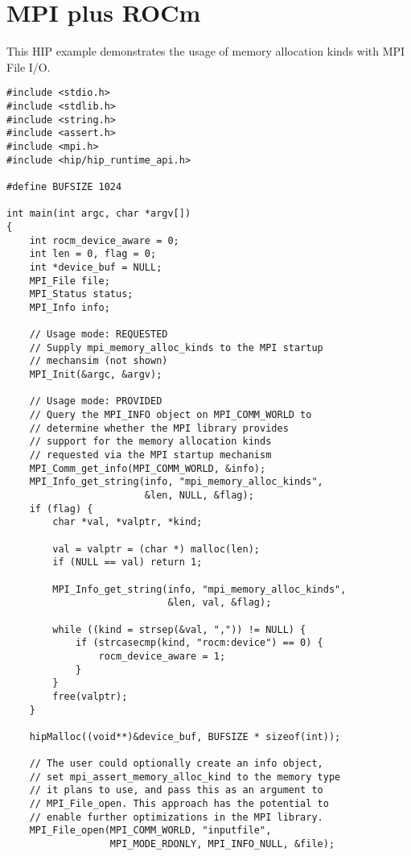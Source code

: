 \section{MPI plus ROCm}

\begin{example}
\label{example:alloc-kind-wpm-hip}
This HIP example demonstrates the usage of memory
allocation kinds with MPI File I/O. 

\begin{lstlisting}[language={[MPI]C}]
#include <stdio.h>
#include <stdlib.h>
#include <string.h>
#include <assert.h>
#include <mpi.h>
#include <hip/hip_runtime_api.h>

#define BUFSIZE 1024

int main(int argc, char *argv[])
{
    int rocm_device_aware = 0;
    int len = 0, flag = 0;
    int *device_buf = NULL;
    MPI_File file;
    MPI_Status status;
    MPI_Info info;

    // Usage mode: REQUESTED
    // Supply mpi_memory_alloc_kinds to the MPI startup
    // mechansim (not shown)
    MPI_Init(&argc, &argv);

    // Usage mode: PROVIDED
    // Query the MPI_INFO object on MPI_COMM_WORLD to
    // determine whether the MPI library provides 
    // support for the memory allocation kinds 
    // requested via the MPI startup mechanism
    MPI_Comm_get_info(MPI_COMM_WORLD, &info);
    MPI_Info_get_string(info, "mpi_memory_alloc_kinds",
                        &len, NULL, &flag);
    if (flag) {
        char *val, *valptr, *kind;

        val = valptr = (char *) malloc(len);
        if (NULL == val) return 1;

        MPI_Info_get_string(info, "mpi_memory_alloc_kinds",
                            &len, val, &flag);

        while ((kind = strsep(&val, ",")) != NULL) {
            if (strcasecmp(kind, "rocm:device") == 0) {
                rocm_device_aware = 1;
            }
        }
        free(valptr);
    }

    hipMalloc((void**)&device_buf, BUFSIZE * sizeof(int));

    // The user could optionally create an info object,
    // set mpi_assert_memory_alloc_kind to the memory type
    // it plans to use, and pass this as an argument to
    // MPI_File_open. This approach has the potential to
    // enable further optimizations in the MPI library.
    MPI_File_open(MPI_COMM_WORLD, "inputfile",
                  MPI_MODE_RDONLY, MPI_INFO_NULL, &file);


\end{lstlisting}
\end{example}
